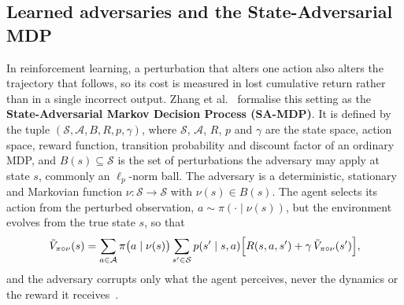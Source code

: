 \subsection{Learned adversaries and the State-Adversarial MDP}
\label{subsec:sa_mdp}

In reinforcement learning, a perturbation that alters one action also alters the
trajectory that follows, so its cost is measured in lost cumulative return rather than
in a single incorrect output. Zhang et al.~\cite{zhang2020robust} formalise this setting
as the \textbf{State-Adversarial Markov Decision Process (SA-MDP)}. It is defined by the
tuple $(\mathcal{S}, \mathcal{A}, B, R, p, \gamma)$, where $\mathcal{S}$, $\mathcal{A}$,
$R$, $p$ and $\gamma$ are the state space, action space, reward function, transition
probability and discount factor of an ordinary MDP, and $B(s) \subseteq \mathcal{S}$ is
the set of perturbations the adversary may apply at state $s$, commonly an
$\ell_p$-norm ball. The adversary is a deterministic, stationary and Markovian function
$\nu: \mathcal{S} \to \mathcal{S}$ with $\nu(s) \in B(s)$. The agent selects its action
from the perturbed observation, $a \sim \pi(\cdot \mid \nu(s))$, but the environment
evolves from the true state $s$, so that
\begin{equation}
\tilde{V}_{\pi \circ \nu}(s) = \sum_{a \in \mathcal{A}} \pi\bigl(a \mid \nu(s)\bigr)
\sum_{s' \in \mathcal{S}} p(s' \mid s, a)
\Bigl[ R(s, a, s') + \gamma \, \tilde{V}_{\pi \circ \nu}(s') \Bigr],
\label{eq:samdp_value}
\end{equation}
and the adversary corrupts only what the agent perceives, never the dynamics or the
reward it receives~\cite{zhang2020robust}.

